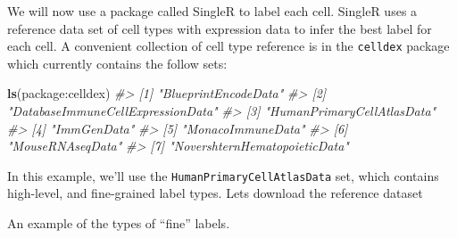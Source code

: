 \documentclass[
]{book}
\newenvironment{Shaded}{\begin{snugshade}}{\end{snugshade}}
\newcommand{\CommentTok}[1]{\textcolor[rgb]{0.56,0.35,0.01}{\textit{#1}}}
\newcommand{\FunctionTok}[1]{\textcolor[rgb]{0.13,0.29,0.53}{\textbf{#1}}}
\newcommand{\NormalTok}[1]{#1}
\newcommand{\OtherTok}[1]{\textcolor[rgb]{0.56,0.35,0.01}{#1}}
\newcommand{\SpecialCharTok}[1]{\textcolor[rgb]{0.81,0.36,0.00}{\textbf{#1}}}
\newcommand{\StringTok}[1]{\textcolor[rgb]{0.31,0.60,0.02}{#1}}
\begin{document}
We will now use a package called SingleR to label each cell. SingleR uses a reference data set of cell types with expression data to infer the best label for each cell. A convenient collection of cell type reference is in the \texttt{celldex} package which currently contains the follow sets:

\begin{Shaded}
\begin{Highlighting}[]
\FunctionTok{ls}\NormalTok{(}\StringTok{\textquotesingle{}package:celldex\textquotesingle{}}\NormalTok{)}
\CommentTok{\#\textgreater{} [1] "BlueprintEncodeData"             }
\CommentTok{\#\textgreater{} [2] "DatabaseImmuneCellExpressionData"}
\CommentTok{\#\textgreater{} [3] "HumanPrimaryCellAtlasData"       }
\CommentTok{\#\textgreater{} [4] "ImmGenData"                      }
\CommentTok{\#\textgreater{} [5] "MonacoImmuneData"                }
\CommentTok{\#\textgreater{} [6] "MouseRNAseqData"                 }
\CommentTok{\#\textgreater{} [7] "NovershternHematopoieticData"}
\end{Highlighting}
\end{Shaded}

In this example, we'll use the \texttt{HumanPrimaryCellAtlasData} set, which contains high-level, and fine-grained label types. Lets download the reference dataset

\begin{Shaded}
\end{Shaded}

An example of the types of ``fine'' labels.
\end{document}
